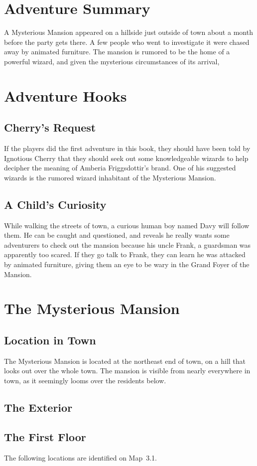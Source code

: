 \section{Adventure Summary}
A Mysterious Mansion appeared on a hillside just outside of town about a month before the party gets there. A few people who went to investigate it were chased away by animated furniture. The mansion is rumored to be the home of a powerful wizard, and given the mysterious circumstances of its arrival, 
\section{Adventure Hooks}
\subsection{Cherry's Request}
If the players did the first adventure in this book, they should have been told by Ignotious Cherry that they should seek out some knowledgeable wizards to help decipher the meaning of Amberia Friggsdottir's brand. One of his suggested wizards is the rumored wizard inhabitant of the Mysterious Mansion.
\subsection{A Child's Curiosity}
While walking the streets of town, a curious human boy named Davy will follow them. He can be caught and questioned, and reveals he really wants some adventurers to check out the mansion because his uncle Frank, a guardsman was apparently too scared. If they go talk to Frank, they can learn he was attacked by animated furniture, giving them an eye to be wary in the Grand Foyer of the Mansion.
\section{The Mysterious Mansion}
\subsection{Location in Town}
The Mysterious Mansion is located at the northeast end of town, on a hill that looks out over the whole town. The mansion is visible from nearly everywhere in town, as it seemingly looms over the residents below.
\subsection{The Exterior}

\subsection{The First Floor}
The following locations are identified on Map~3.1.
